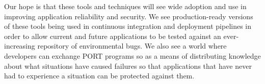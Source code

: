 Our hope is that these tools and techniques will see wide
adoption and use in improving application reliability and security.
We see production-ready versions of these tools being used in continuous
integration and deployment pipelines in order to allow current and future
applications to be tested against an ever-increasing repository of
environmental bugs.
We also see a world where developers can exchange PORT programs so as a
means of distributing knowledge about what situations have caused failures
so that applications that have never had to experience a situation can
be protected against them.

\vspace*{3ex plus 1fil}
